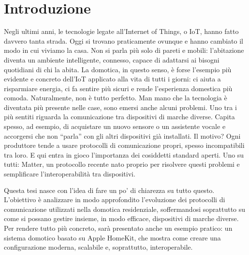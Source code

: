\chapter{Introduzione}
Negli ultimi anni, le tecnologie legate all’Internet of Things, o IoT, hanno fatto davvero tanta strada. Oggi si trovano praticamente ovunque e hanno cambiato il modo in cui viviamo la casa. Non si parla più solo di pareti e mobili: l’abitazione diventa un ambiente intelligente, connesso, capace di adattarsi ai bisogni quotidiani di chi la abita. La domotica, in questo senso, è forse l’esempio più evidente e concreto dell’IoT applicato alla vita di tutti i giorni: ci aiuta a risparmiare energia, ci fa sentire più sicuri e rende l’esperienza domestica più comoda.
\vspace{0.5cm}
Naturalmente, non è tutto perfetto. Man mano che la tecnologia è diventata più presente nelle case, sono emersi anche alcuni problemi. Uno tra i più sentiti riguarda la comunicazione tra dispositivi di marche diverse. Capita spesso, ad esempio, di acquistare un nuovo sensore o un assistente vocale e accorgersi che non “parla” con gli altri dispositivi già installati. Il motivo? Ogni produttore tende a usare protocolli di comunicazione propri, spesso incompatibili tra loro. E qui entra in gioco l’importanza dei cosiddetti standard aperti. Uno su tutti: Matter, un protocollo recente nato proprio per risolvere questi problemi e semplificare l’interoperabilità tra dispositivi.

\vspace{0.5cm}
Questa tesi nasce con l’idea di fare un po’ di chiarezza su tutto questo. L’obiettivo è analizzare in modo approfondito l’evoluzione dei protocolli di comunicazione utilizzati nella domotica residenziale, soffermandosi soprattutto su come si possano gestire insieme, in modo efficace, dispositivi di marche diverse. Per rendere tutto più concreto, sarà presentato anche un esempio pratico: un sistema domotico basato su Apple HomeKit, che mostra come creare una configurazione moderna, scalabile e, soprattutto, interoperabile.

